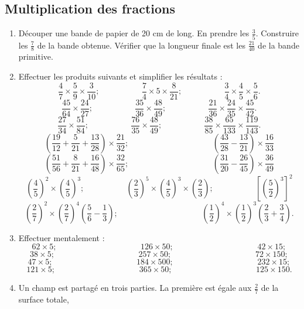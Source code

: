 \documentclass[12 pt]{extarticle}
\theoremstyle{plain}
\begin{document}
 \subsection{Multiplication des fractions}
 
 \begin{enumerate}
 \item Découper une bande de papier de 20 cm de long. 
 En prendre les $\frac35$. Construire les $\frac78$ de la bande obtenue. Vérifier que la longueur finale est les $\frac{21}{40}$ de la bande primitive. 
 \item Effectuer les produits suivants et simplifier les résultats : 
 \[ \frac47\times \frac59\times \frac3{10}; 
 \phantom{meowmeow} \frac74\times5\times\frac8{21};
  \phantom{meowmeow}  \frac34\times \frac45\times \frac56.\] 
   \[ \frac{45}{64}\times\frac{24}{27}; 
 \phantom{meowmeow} \frac{35}{36}\times\frac{48}{49};
  \phantom{meowmeow}  \frac{21}{36}\times\frac{24}{35} \times \frac{45}{42}.\] 
   \[ \frac{27}{34}\times \frac{51}{84}; 
 \phantom{meowmeow} \frac{76}{35}\times\frac{48}{49};
  \phantom{meowmeow}  \frac{38}{85}\times \frac{65}{133} \times \frac{119}{143}.\] 
  \[ \left(\frac{19}{12} + \frac5{21} + \frac{13}{28}
   \right)\times\frac{21}{32}; \phantom{meowmeowmeowmeow}
   \left(\frac{43}{28}-\frac{13}{21}\right)\times 
   \frac{16}{33} \]
     \[ \left(\frac{51}{56} + \frac8{21} + \frac{16}{48}
   \right)\times\frac{32}{65}; \phantom{meowmeowmeowmeow}
   \left(\frac{31}{20}-\frac{26}{45}\right)\times 
   \frac{36}{49} \]
   \[ \left( \frac45\right)^2 \times \left(\frac45\right)^3; \phantom{meowmeow} 
   \left( \frac23\right)^5 \times \left(\frac45\right)^3\times \left(\frac23\right);
   \phantom{meowmeow} \left[\left(\frac52\right)^3\right]^2\]
   \[ \left(\frac27\right)^2 \times \left(\frac27\right)^4\left(\frac56-\frac13\right) ; 
    \phantom{meowmeowmeowmeow}
    \left(\frac12\right)^4 \times \left(\frac12\right)^3 \left(\frac23+\frac34\right).\]
 \item Effectuer mentalement : 
 \[ 62 \times 5;  \phantom{meowmeowmeowmeow}
 126 \times 50;  \phantom{meowmeowmeowmeow}
 42 \times 15;\]
  \[ 38 \times 5;  \phantom{meowmeowmeowmeow}
 257 \times 50;  \phantom{meowmeowmeowmeow}
 72 \times 150;\] \[ 47 \times 5;  \phantom{meowmeowmeowmeow}
 184 \times 500;  \phantom{meowmeowmeowmeow}
 232 \times 15;\] 
 \[ 121 \times 5;  \phantom{meowmeowmeowmeow}
 365 \times 50;  \phantom{meowmeowmeowmeow}
 125 \times 150.\]
 \item Un champ est partagé en trois parties. La première est égale aux $\frac27$ de la surface totale,

\end{enumerate}
\end{document}
